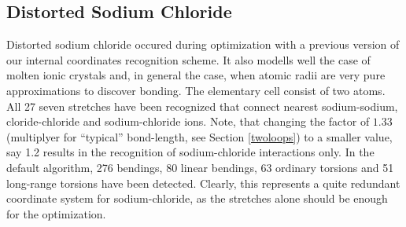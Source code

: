 \documentclass[prl,aps,preprint,superbib,12pt]{revtex4}
\begin{document}
\subsection{Distorted Sodium Chloride}
Distorted sodium chloride occured during optimization 
with a previous version of
our internal coordinates recognition scheme. 
It also modells well the case of molten ionic crystals and,
in general the case, when atomic radii are very pure approximations
to discover bonding. The elementary cell consist of two atoms.
All 27 seven stretches have been recognized that connect nearest
sodium-sodium, cloride-chloride and sodium-chloride ions.
Note, that changing the factor of $1.33$ (multiplyer for ``typical''
bond-length, see Section \ref{twoloops}) to a smaller value, say
1.2 results in the recognition of sodium-chloride interactions only.
In the default algorithm, 276 bendings, 80 linear bendings,
63 ordinary torsions and 51 long-range torsions have been detected.
Clearly, this represents a quite redundant coordinate system for 
sodium-chloride, as the stretches alone should be enough for the
optimization.
\end{document}
